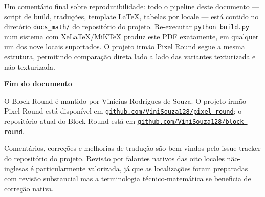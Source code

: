 \documentclass[12pt,a4paper]{scrartcl}
\newcommand{\code}[1]{\texttt{\small #1}}
\newcommand{\biblink}[2]{\href{#1}{\nolinkurl{#2}}}
\begin{document}
Um comentário final sobre reprodutibilidade: todo o pipeline deste documento --- script de build, traduções, template LaTeX, tabelas por locale --- está contido no diretório \code{docs\_math/} do repositório do projeto. Re-executar \code{python build.py} num sistema com XeLaTeX/MiKTeX produz este PDF exatamente, em qualquer um dos nove locais suportados. O projeto irmão Pixel Round segue a mesma estrutura, permitindo comparação direta lado a lado das variantes texturizada e não-texturizada.

\vspace{1.2em}

\begin{center}
{\sffamily\bfseries\color{accent}Fim do documento}
\end{center}

\vspace{0.6em}

O Block Round é mantido por Vinícius Rodrigues de Souza. O projeto irmão Pixel Round está disponível em \biblink{https://github.com/ViniSouza128/pixel-round}{github.com/ViniSouza128/pixel-round}; o repositório atual do Block Round está em \biblink{https://github.com/ViniSouza128/block-round}{github.com/ViniSouza128/block-round}.

Comentários, correções e melhorias de tradução são bem-vindos pelo issue tracker do repositório do projeto. Revisão por falantes nativos das oito locales não-inglesas é particularmente valorizada, já que as localizações foram preparadas com revisão substancial mas a terminologia técnico-matemática se beneficia de correção nativa.
\end{document}
